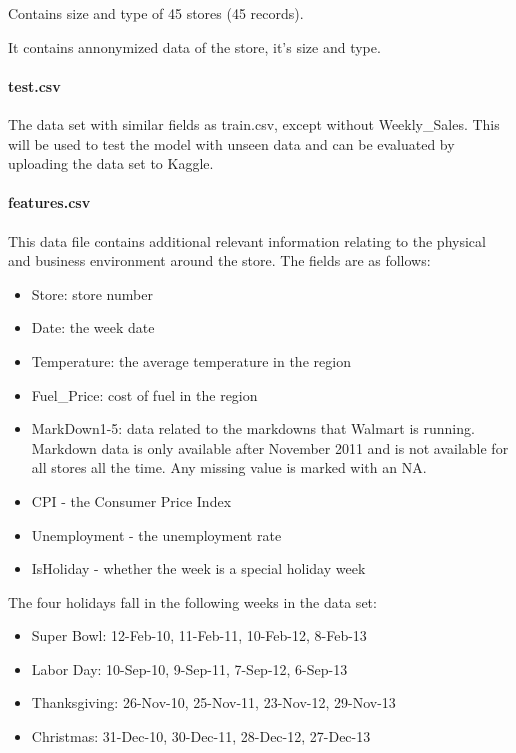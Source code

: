 \documentclass[]{article}
\begin{document}
Contains size and type of 45 stores (45 records).

It contains annonymized data of the store, it's size and type.

\paragraph{test.csv}\label{test.csv}

The data set with similar fields as train.csv, except without
Weekly\_Sales. This will be used to test the model with unseen data and
can be evaluated by uploading the data set to Kaggle.

\paragraph{features.csv}\label{features.csv}

This data file contains additional relevant information relating to the
physical and business environment around the store. The fields are as
follows:

\begin{itemize}
\itemsep1pt\parskip0pt
\item
  Store: store number
\item
  Date: the week date
\item
  Temperature: the average temperature in the region
\item
  Fuel\_Price: cost of fuel in the region
\item
  MarkDown1-5: data related to the markdowns that Walmart is running.
  Markdown data is only available after November 2011 and is not
  available for all stores all the time. Any missing value is marked
  with an NA.
\item
  CPI - the Consumer Price Index
\item
  Unemployment - the unemployment rate
\item
  IsHoliday - whether the week is a special holiday week
\end{itemize}

The four holidays fall in the following weeks in the data set:

\begin{itemize}
\itemsep1pt\parskip0pt
\item
  Super Bowl: 12-Feb-10, 11-Feb-11, 10-Feb-12, 8-Feb-13
\item
  Labor Day: 10-Sep-10, 9-Sep-11, 7-Sep-12, 6-Sep-13
\item
  Thanksgiving: 26-Nov-10, 25-Nov-11, 23-Nov-12, 29-Nov-13
\item
  Christmas: 31-Dec-10, 30-Dec-11, 28-Dec-12, 27-Dec-13
\end{itemize}
\end{document}
